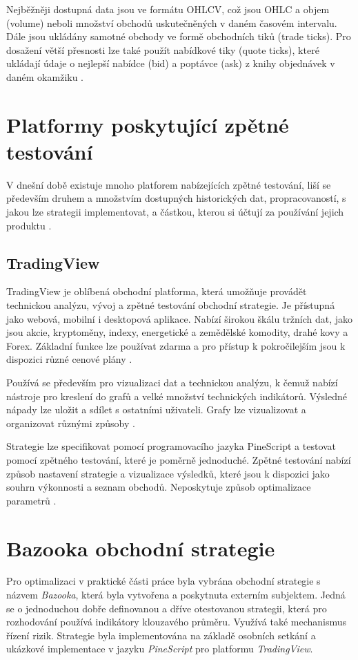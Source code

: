 Nejběžněji dostupná data jsou ve formátu OHLCV, což jsou OHLC a objem (volume) neboli množství obchodů uskutečněných v daném časovém intervalu.
Dále jsou ukládány samotné obchody ve formě obchodních tiků (trade ticks).
Pro dosažení větší přesnosti lze také použít nabídkové tiky (quote ticks), které ukládají údaje o nejlepší nabídce (bid) a poptávce (ask) z knihy objednávek v daném okamžiku \cite{polygon}.

\section{Platformy poskytující zpětné testování}
V dnešní době existuje mnoho platforem nabízejících zpětné testování, liší se především druhem a množstvím dostupných historických dat, propracovaností, s jakou lze strategii implementovat, a částkou, kterou si účtují za používání jejich produktu \cite{bowman}.



\subsection{TradingView}
TradingView je oblíbená obchodní platforma, která umožňuje provádět technickou analýzu, vývoj a zpětné testování obchodní strategie.
Je přístupná jako webová, mobilní i desktopová aplikace. 
Nabízí širokou škálu tržních dat, jako jsou akcie, kryptoměny, indexy, energetické a zemědělské komodity, drahé kovy a Forex.
Základní funkce lze používat zdarma a pro přístup k pokročilejším jsou k dispozici různé cenové plány \cite{bowman}.

Používá se především pro vizualizaci dat a technickou analýzu, k čemuž nabízí nástroje pro kreslení do grafů a velké množství technických indikátorů.
Výsledné nápady lze uložit a sdílet s ostatními uživateli.
Grafy lze vizualizovat a organizovat různými způsoby \cite{tradingview}.

Strategie lze specifikovat pomocí programovacího jazyka PineScript a testovat pomocí zpětného testování, které je poměrně jednoduché.
Zpětné testování nabízí způsob nastavení strategie a vizualizace výsledků, které jsou k dispozici jako souhrn výkonnosti a seznam obchodů.
Neposkytuje způsob optimalizace parametrů \cite{tradingview}.

\section{Bazooka obchodní strategie}
Pro optimalizaci v praktické části práce byla vybrána obchodní strategie s názvem \textit{Bazooka}, která byla vytvořena a poskytnuta externím subjektem.
Jedná se o jednoduchou dobře definovanou a dříve otestovanou strategii, která pro rozhodování používá indikátory klouzavého průměru.
Využívá také mechanismus řízení rizik.
Strategie byla implementována na základě osobních setkání a ukázkové implementace v jazyku \textit{PineScript} pro platformu \textit{TradingView}.

